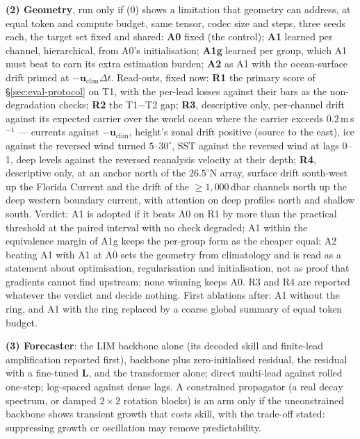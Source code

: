 \documentclass[10pt]{article}
\begin{document}
\textbf{(2) Geometry}, run only if (0) shows a limitation that geometry
can address, at equal token and compute budget, same tensor, codec size and
steps, three seeds each, the target set fixed and shared: \textbf{A0} fixed
(the control); \textbf{A1} learned per channel, hierarchical, from A0's
initialisation; \textbf{A1g} learned per group, which A1 must beat to earn
its extra estimation burden; \textbf{A2} as A1 with the ocean-surface drift
primed at $-\mathbf{u}_{\text{clim}}\Delta t$. Read-outs, fixed now:
\textbf{R1} the primary score of \S\ref{sec:eval-protocol} on T1, with the
per-lead losses against their bars as the non-degradation checks;
\textbf{R2} the T1$-$T2 gap; \textbf{R3}, descriptive only, per-channel drift
against its expected carrier over the world ocean where the carrier exceeds
$0.2$\,m\,s$^{-1}$ --- currents against $-\mathbf{u}_{\text{clim}}$,
height's zonal drift positive (source to the east), ice against the reversed
wind turned $5$--$30^\circ$, SST against the reversed wind at lags 0--1,
deep levels against the reversed reanalysis velocity at their depth;
\textbf{R4}, descriptive only, at an anchor north of the $26.5^\circ$N array,
surface drift south-west up the Florida Current and the drift of the
${\ge}1{,}000$\,dbar channels north up the deep western boundary current,
with attention on deep profiles north and shallow south. Verdict: A1 is
adopted if it beats A0 on R1 by more than the practical threshold at the
paired interval with no check degraded; A1 within the equivalence margin of
A1g keeps the per-group form as the cheaper equal; A2 beating A1 with A1 at
A0 sets the geometry from climatology and is read as a statement about
optimisation, regularisation and initialisation, not as proof that gradients
cannot find upstream; none winning keeps A0. R3 and R4 are reported whatever
the verdict and decide nothing. First ablations after: A1 without the ring,
and A1 with the ring replaced by a coarse global summary of equal token
budget.

\textbf{(3) Forecaster}: the LIM backbone alone (its decoded skill and
finite-lead amplification reported first), backbone plus zero-initialised
residual, the residual with a fine-tuned $\mathbf{L}$, and the transformer
alone; direct multi-lead against rolled one-step; log-spaced against dense
lags. A constrained propagator (a real decay spectrum, or damped $2\times2$
rotation blocks) is an arm only if the unconstrained backbone shows
transient growth that costs skill, with the trade-off stated: suppressing
growth or oscillation may remove predictability.
\end{document}
